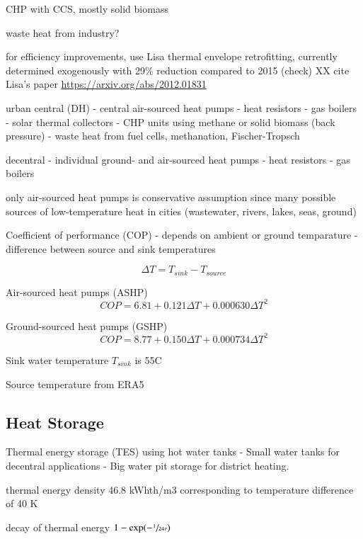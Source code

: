 CHP with CCS, mostly solid biomass

waste heat from industry?

for efficiency improvements, use Lisa thermal envelope retrofitting, currently
determined exogenously with 29\% reduction compared to 2015 (check) XX cite
Lisa's paper \url{https://arxiv.org/abs/2012.01831}

urban central (DH)
- central air-sourced heat pumps
- heat resistors
- gas boilers
- solar thermal collectors
- CHP units using methane or solid biomass (back pressure)
- waste heat from fuel cells, methanation, Fischer-Tropsch

decentral
- individual ground- and air-sourced heat pumps
- heat resistors
- gas boilers

only air-sourced heat pumps is conservative assumption since many possible sources of
low-temperature heat in cities (wastewater, rivers, lakes, seas, ground)

Coefficient of performance (COP)
- depends on ambient or ground temparature
- difference between source and sink temperatures

\begin{equation}
    \Delta T = T_{sink} - T_{source}
\end{equation}

Air-sourced heat pumps (ASHP)
\begin{equation}
    COP = 6.81 + 0.121 \Delta T + 0.000630 \Delta T^2
\end{equation}

Ground-sourced heat pumps (GSHP)
\begin{equation}
    COP = 8.77 + 0.150 \Delta T + 0.000734 \Delta T^2
\end{equation}

Sink water temperature $T_{sink}$ is 55\deg{}C

Source temperature from ERA5

\subsection{Heat Storage}

Thermal energy storage (TES) using hot water tanks
- Small water tanks for decentral applications
- Big water pit storage for district heating.

thermal energy density 46.8 kWhth/m3 corresponding to temperature difference of 40 K

decay of thermal energy $1-\exp(-\sfrac{1}{24\tau})$

